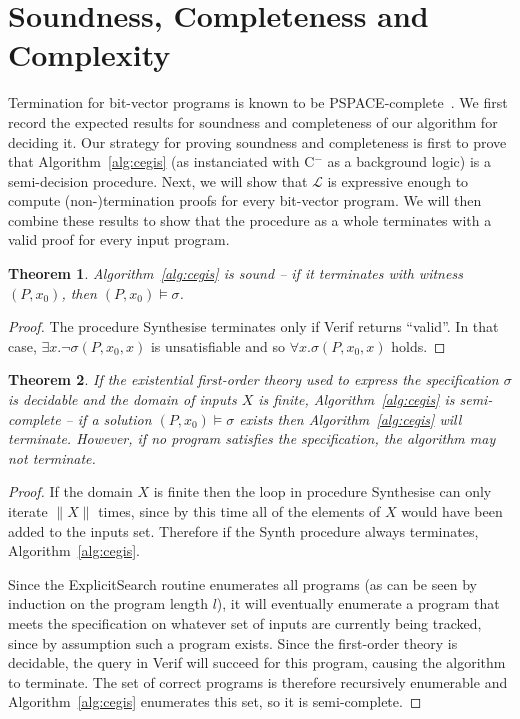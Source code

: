 \documentclass[preprint]{sigplanconf}
\newtheorem{theorem}{Theorem}
\theoremstyle{definition}
\newcommand{\newC}{C$^-$\xspace}
\begin{document}
\section{Soundness, Completeness and Complexity}

Termination for bit-vector programs is known to be
PSPACE-complete~\cite{DBLP:conf/tacas/CookKRW10}.  We first record the
expected results for soundness and completeness of our algorithm for
deciding it.  Our strategy for proving soundness and completeness
is first to prove that Algorithm~\ref{alg:cegis} (as instanciated
with \newC as a background logic) is a semi-decision
procedure.  Next, we will show that $\mathcal{L}$ is expressive enough
to compute (non-)termination proofs for every bit-vector program.
We will then combine these results to show that the procedure as a whole
terminates with a valid proof for every input program.
%
\begin{theorem}\label{thm:synth-sound}
Algorithm~\ref{alg:cegis} is sound -- if it terminates with witness $(P, x_0)$, then
$(P, x_0) \models \sigma$.
\end{theorem}

\begin{proof}
 The procedure {\sc Synthesise} terminates only if {\sc Verif} returns ``valid''.  In that
 case, $\exists x . \lnot \sigma(P, x_0, x)$ is unsatisfiable and so $\forall x . \sigma(P, x_0, x)$ holds.
\end{proof}

\begin{theorem}
 \label{thm:synth-semicomplete}
 If the existential first-order theory used to express the specification $\sigma$ is decidable
 and the domain of inputs $X$ is finite,
 Algorithm~\ref{alg:cegis} is semi-complete -- if a solution $(P, x_0) \models \sigma$
 exists then Algorithm~\ref{alg:cegis} will terminate.  However, if no program
 satisfies the specification, the algorithm may not terminate.
\end{theorem}

\begin{proof}
 If the domain $X$ is finite then the loop in procedure {\sc Synthesise} can only
 iterate $\| X \|$ times, since by this time all of the elements of $X$ would have been
 added to the inputs set.  Therefore if the {\sc Synth} procedure always terminates,
 Algorithm~\ref{alg:cegis}.

 Since the {\sc ExplicitSearch} routine enumerates all programs (as can be seen by induction on
 the program length $l$), it will eventually enumerate a program that meets the specification
 on whatever set of inputs are currently being tracked, since by assumption such a program
 exists.  Since the first-order theory is
 decidable, the query in {\sc Verif} will succeed for this program, causing the algorithm to terminate.
 The set of correct programs is therefore recursively enumerable and Algorithm~\ref{alg:cegis}
 enumerates this set, so it is semi-complete.
\end{proof}
\end{document}

